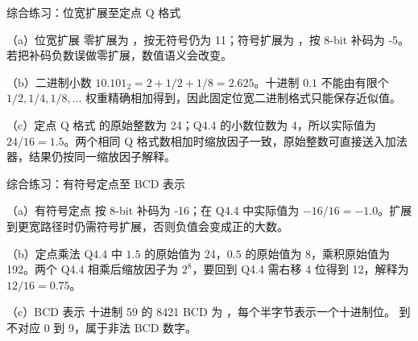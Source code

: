 \begin{chapteranswer}{综合练习：位宽扩展至定点 Q 格式}
\begin{answersubproblem}{（a）位宽扩展}
 零扩展为 ，按无符号仍为 11；符号扩展为 ，按 8-bit 补码为 -5。若把补码负数误做零扩展，数值语义会改变。
\end{answersubproblem}
\begin{answersubproblem}{（b）二进制小数}
$10.101_2=2+1/2+1/8=2.625$。十进制 $0.1$ 不能由有限个 $1/2,1/4,1/8,\ldots$ 权重精确相加得到，因此固定位宽二进制格式只能保存近似值。
\end{answersubproblem}
\begin{answersubproblem}{（c）定点 Q 格式}
 的原始整数为 24；Q4.4 的小数位数为 4，所以实际值为 $24/16=1.5$。两个相同 Q 格式数相加时缩放因子一致，原始整数可直接送入加法器，结果仍按同一缩放因子解释。
\end{answersubproblem}
\end{chapteranswer}

\begin{chapteranswer}{综合练习：有符号定点至 BCD 表示}
\begin{answersubproblem}{（a）有符号定点}
 按 8-bit 补码为 -16；在 Q4.4 中实际值为 $-16/16=-1.0$。扩展到更宽路径时仍需符号扩展，否则负值会变成正的大数。
\end{answersubproblem}
\begin{answersubproblem}{（b）定点乘法}
Q4.4 中 $1.5$ 的原始值为 24，$0.5$ 的原始值为 8，乘积原始值为 192。两个 Q4.4 相乘后缩放因子为 $2^8$，要回到 Q4.4 需右移 4 位得到 12，解释为 $12/16=0.75$。
\end{answersubproblem}
\begin{answersubproblem}{（c）BCD 表示}
十进制 59 的 8421 BCD 为 ，每个半字节表示一个十进制位。 到  不对应 0 到 9，属于非法 BCD 数字。
\end{answersubproblem}
\end{chapteranswer}

